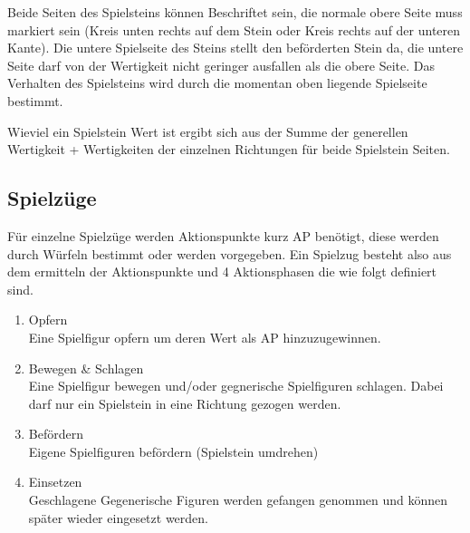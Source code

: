 \documentclass{article}
\begin{document}
	\vspace{0.3cm}
    
    \begin{flushleft}
    
    Beide Seiten des Spielsteins können Beschriftet sein, die normale obere Seite muss 
    markiert sein (Kreis unten rechts auf dem Stein oder Kreis rechts auf der unteren Kante).
	Die untere Spielseite des Steins stellt den beförderten Stein da, die untere Seite darf 
	von der Wertigkeit nicht geringer ausfallen als die obere Seite.
	Das Verhalten des Spielsteins wird durch die momentan oben liegende Spielseite bestimmt.
	
	
	Wieviel ein Spielstein Wert ist ergibt sich aus der Summe der generellen Wertigkeit + Wertigkeiten der einzelnen Richtungen für beide Spielstein Seiten.
	\end{flushleft}
	
	
\subsection{Spielzüge}

	Für einzelne Spielzüge werden Aktionspunkte kurz AP benötigt, diese werden durch Würfeln bestimmt oder werden vorgegeben.
	Ein Spielzug besteht also aus dem ermitteln der Aktionspunkte und 4 Aktionsphasen die wie folgt definiert sind.
	\begin{enumerate}
	\item Opfern \\
		  Eine Spielfigur opfern um deren Wert als AP hinzuzugewinnen.
	\item Bewegen \& Schlagen \\
		  Eine Spielfigur bewegen und/oder gegnerische Spielfiguren schlagen. Dabei darf nur
		  ein Spielstein in eine Richtung gezogen werden.
	\item Befördern \\
		  Eigene Spielfiguren befördern (Spielstein umdrehen)
	\item Einsetzen \\
		  Geschlagene Gegenerische Figuren werden gefangen genommen und können später
		  wieder eingesetzt werden.
	\end{enumerate}
\end{document}
